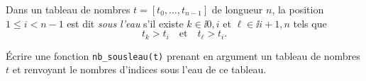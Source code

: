 Dans un tableau de nombres $t = [t_0,\dots,t_{n-1}]$ de longueur $n$, la position $1 \leq i < n-1$ est dit \emph{sous l'eau} s'il existe $k \in \ii{0,i}$ et $\ell \in \ii{i+1,n}$ tels que 
\begin{equation*}
  t_k > t_i \quad\textrm{et}\quad t_\ell > t_i. 
\end{equation*}

\question{} Écrire une fonction \texttt{nb\_sousleau(t)} prenant en argument un tableau de nombres $t$ et renvoyant le nombres d'indices sous l'eau de ce tableau. 